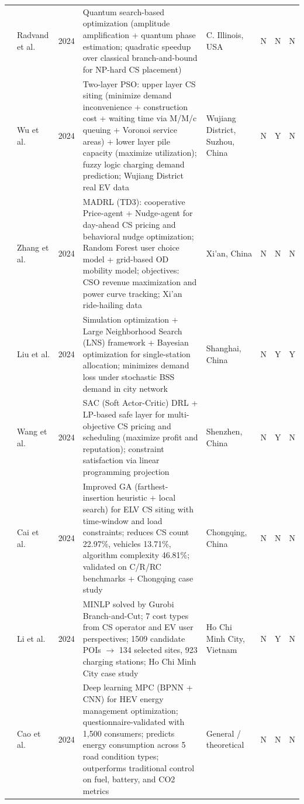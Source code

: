 \documentclass[letterpaper, 12pt, oneside, doublespacing]{Thesis}
\begin{document}
\begin{longtable}{L{0.9cm} L{1.8cm} L{0.7cm} L{2.5cm} L{2.1cm} L{0.7cm} L{0.7cm} L{0.7cm}}
\cite{a_quantum_2024} & Radvand et al. & 2024 & Quantum search-based optimization (amplitude amplification + quantum phase estimation; quadratic speedup over classical branch-and-bound for NP-hard CS placement) & C. Illinois, USA & N & N & N \\
\cite{a_two-layer_2024} & Wu et al. & 2024 & Two-layer PSO: upper layer CS siting (minimize demand inconvenience + construction cost + waiting time via M/M/c queuing + Voronoi service areas) + lower layer pile capacity (maximize utilization); fuzzy logic charging demand prediction; Wujiang District real EV data & Wujiang District, Suzhou, China & N & Y & N \\
\cite{advancing_urban_2024} & Zhang et al. & 2024 & MADRL (TD3): cooperative Price-agent + Nudge-agent for day-ahead CS pricing and behavioral nudge optimization; Random Forest user choice model + grid-based OD mobility model; objectives: CSO revenue maximization and power curve tracking; Xi'an ride-hailing data & Xi'an, China & N & N & N \\
\cite{battery_swapping_2024} & Liu et al. & 2024 & Simulation optimization + Large Neighborhood Search (LNS) framework + Bayesian optimization for single-station allocation; minimizes demand loss under stochastic BSS demand in city network & Shanghai, China & N & Y & Y \\
\cite{beyond_profit_2024} & Wang et al. & 2024 & SAC (Soft Actor-Critic) DRL + LP-based safe layer for multi-objective CS pricing and scheduling (maximize profit and reputation); constraint satisfaction via linear programming projection & Shenzhen, China & N & Y & N \\
\cite{charging_station_2024} & Cai et al. & 2024 & Improved GA (farthest-insertion heuristic + local search) for ELV CS siting with time-window and load constraints; reduces CS count 22.97\%, vehicles 13.71\%, algorithm complexity 46.81\%; validated on C/R/RC benchmarks + Chongqing case study & Chongqing, China & N & N & N \\
\cite{electric_vehicle_2024} & Li et al. & 2024 & MINLP solved by Gurobi Branch-and-Cut; 7 cost types from CS operator and EV user perspectives; 1509 candidate POIs $\rightarrow$ 134 selected sites, 923 charging stations; Ho Chi Minh City case study & Ho Chi Minh City, Vietnam & N & Y & N \\
\cite{energy_management_2024} & Cao et al. & 2024 & Deep learning MPC (BPNN + CNN) for HEV energy management optimization; questionnaire-validated with 1,500 consumers; predicts energy consumption across 5 road condition types; outperforms traditional control on fuel, battery, and CO2 metrics & General {\slash} theoretical & N & N & N \\

\end{longtable}
\end{document}
